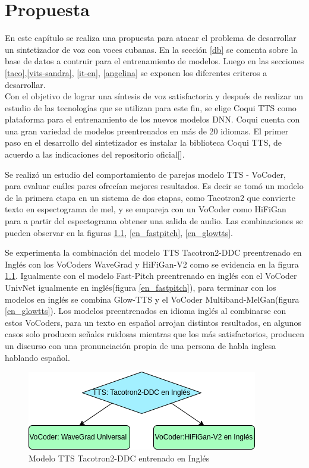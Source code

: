 \chapter{Propuesta}\label{chapter:proposal}
En este capítulo se realiza una propuesta para atacar el problema de desarrollar un sintetizador de voz con voces cubanas. En la sección \ref{db} se comenta sobre la base de datos a contruir para el entrenamiento de modelos. Luego en las secciones \ref{taco},\ref{vits-sandra}, \ref{it-en}, \ref{angelina} se exponen los diferentes criteros a desarrollar.\\

Con el objetivo de lograr una síntesis de voz satisfactoria y después de realizar un estudio de las tecnologías que se utilizan para este fin, se elige Coqui TTS como plataforma para el entrenamiento de los nuevos modelos DNN. Coqui cuenta con una gran variedad de modelos preentrenados en más de 20 idiomas.  
El primer paso en el desarrollo del sintetizador es instalar la biblioteca Coqui TTS, de acuerdo a las indicaciones del repositorio oficial[\cite{coqui-doc}].

 Se realizó un estudio del comportamiento de parejas modelo TTS - VoCoder, para evaluar cuáles pares ofrecían mejores resultados. Es decir se tomó un modelo de la primera etapa en un sistema de dos etapas, como Tacotron2 que convierte texto en espectograma de mel, y se empareja con un VoCoder como HiFiGan para a partir del espectograma obtener una salida de audio. Las combinaciones se pueden observar en la figuras \ref{en_tacotron2}, \ref{en_fastpitch}, \ref{en_glowtts}.

Se experimenta la combinación del modelo TTS Tacotron2-DDC preentrenado en Inglés con los VoCoders WaveGrad y HiFiGan-V2 como se evidencia en la figura \ref{en_tacotron2}. Igualmente con el modelo Fast-Pitch preentrenado en inglés con el VoCoder UnivNet igualmente en inglés(figura \ref{en_fastpitch}), para terminar con los modelos en inglés se combina Glow-TTS y el VoCoder Multiband-MelGan(figura \ref{en_glowtts}).
Los modelos preentrenados en idioma inglés al combinarse con estos VoCoders, para un texto en español arrojan distintos resultados, en algunos casos solo producen señales ruidosas mientras que los más satisfactorios, producen un discurso con una pronunciación propia de una persona de habla inglesa hablando español.

\begin{figure}[H]
	\centering
	\includegraphics[width=0.6\linewidth]{Graphics/en_tacotron2}
	\caption{Modelo TTS Tacotron2-DDC entrenado en Inglés}
	\label{en_tacotron2}
\end{figure}


